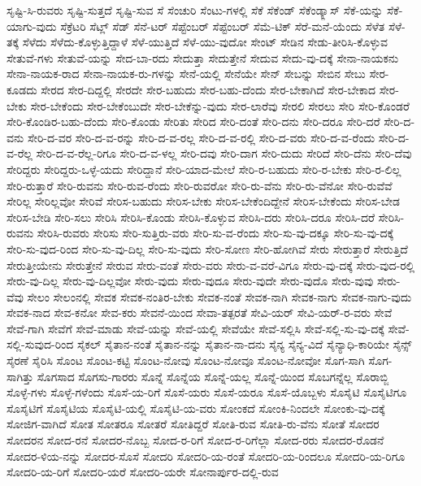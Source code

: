 {ಸೃಷ್ಟಿ-ಸಿ-ರುವರು
ಸೃಷ್ಟಿ-ಸುತ್ತದೆ
ಸೃಷ್ಟಿ-ಸುವ
ಸೆ
ಸೆಂಚುರಿ
ಸೆಂಟು-ಗಳಲ್ಲಿ
ಸೆಕೆ
ಸೆಕೆಂಡ್
ಸೆಕೆಂಡ್ಕ್ಲಾಸ್
ಸೆಕೆ-ಯನ್ನು
ಸೆಕೆ-ಯಾಗು-ವುದು
ಸೆಕ್ರೆಟರಿ
ಸೆಟ್ಲ್
ಸೆಡ್
ಸೆನೆ-ಟರ್
ಸೆಪ್ಟೆಂಬರ್
ಸೆಪ್ಟೆಂಬರ್
ಸೆಮೆ-ಟಿಕ್
ಸೆರೆ-ಮನೆ-ಯೆಂದು
ಸೆಳೆತ
ಸೆಳೆ-ತಕ್ಕೆ
ಸೆಳೆದು
ಸೆಳೆದು-ಕೊಳ್ಳುತ್ತಿದ್ದಾಳೆ
ಸೆಳೆ-ಯುತ್ತಿದೆ
ಸೆಳೆ-ಯು-ವುದೋ
ಸೇಂಟ್
ಸೇಡಿನ
ಸೇಡು-ತೀರಿಸಿ-ಕೊಳ್ಳುವ
ಸೇತುವೆ-ಗಳು
ಸೇತುವೆ-ಯನ್ನು
ಸೇದ-ಬಾ-ರದು
ಸೇದುತ್ತಾ
ಸೇದುತ್ತೇನೆ
ಸೇದುವ
ಸೇದು-ವು-ದಕ್ಕೆ
ಸೇನಾ-ನಾಯಕನು
ಸೇನಾ-ನಾಯಕ-ರಾದ
ಸೇನಾ-ನಾಯಕ-ರು-ಗಳನ್ನು
ಸೇನೆ-ಯಲ್ಲಿ
ಸೇನೆಯೇ
ಸೇನ್
ಸೇಬನ್ನು
ಸೇಬಿನ
ಸೇಬು
ಸೇರ-ಕೂಡದು
ಸೇರದ
ಸೇರ-ದಿದ್ದಲ್ಲಿ
ಸೇರದೇ
ಸೇರ-ಬಹುದು
ಸೇರ-ಬಹು-ದೆಂದು
ಸೇರ-ಬೇಕಾಗಿದೆ
ಸೇರ-ಬೇಕಾದ
ಸೇರ-ಬೇಕು
ಸೇರ-ಬೇಕೆಂದು
ಸೇರ-ಬೇಕೆಂಬುದೇ
ಸೇರ-ಬೇಕೆನ್ನು-ವುದು
ಸೇರ-ಲಾರೆವು
ಸೇರಲಿ
ಸೇರಲು
ಸೇರಿ
ಸೇರಿ-ಕೊಂಡರೆ
ಸೇರಿ-ಕೊಂಡಿರ-ಬಹು-ದೆಂದು
ಸೇರಿ-ಕೊಂಡು
ಸೇರಿತು
ಸೇರಿದ
ಸೇರಿ-ದಂತೆ
ಸೇರಿ-ದನು
ಸೇರಿ-ದರೂ
ಸೇರಿ-ದರೆ
ಸೇರಿ-ದ-ವನು
ಸೇರಿ-ದ-ವರ
ಸೇರಿ-ದ-ವ-ರನ್ನು
ಸೇರಿ-ದ-ವ-ರಲ್ಲ
ಸೇರಿ-ದ-ವ-ರಲ್ಲಿ
ಸೇರಿ-ದ-ವರು
ಸೇರಿ-ದ-ವ-ರೆಂದು
ಸೇರಿ-ದ-ವ-ರೆಲ್ಲ
ಸೇರಿ-ದ-ವ-ರೆಲ್ಲ-ರಿಗೂ
ಸೇರಿ-ದ-ವ-ಳಲ್ಲ
ಸೇರಿ-ದವು
ಸೇರಿ-ದಾಗ
ಸೇರಿ-ದುದು
ಸೇರಿದೆ
ಸೇರಿ-ದೆನು
ಸೇರಿ-ದೆವು
ಸೇರಿದ್ದರು
ಸೇರಿದ್ದರು-ಒಳ್ಳೆ-ಯದು
ಸೇರಿದ್ದಾನೆ
ಸೇರಿ-ಯಾದ-ಮೇಲೆ
ಸೇರಿ-ರ-ಬಹುದು
ಸೇರಿ-ರ-ಬೇಕು
ಸೇರಿ-ರ-ಲಿಲ್ಲ
ಸೇರಿ-ರುತ್ತಾರೆ
ಸೇರಿ-ರುವನು
ಸೇರಿ-ರುವ-ರೆಂದು
ಸೇರಿ-ರುವರೋ
ಸೇರಿ-ರು-ವೆನು
ಸೇರಿ-ರು-ವೆನೋ
ಸೇರಿ-ರುವೆವೆ
ಸೇರಿಲ್ಲ
ಸೇರಿಲ್ಲವೋ
ಸೇರಿವೆ
ಸೇರಿಸ-ಬಹುದು
ಸೇರಿಸ-ಬೇಕು
ಸೇರಿಸ-ಬೇಕೆಂದಿದ್ದೇನೆ
ಸೇರಿಸ-ಬೇಕೆಂದು
ಸೇರಿಸ-ಬೇಡ
ಸೇರಿಸ-ಬೇಡಿ
ಸೇರಿ-ಸಲು
ಸೇರಿಸಿ
ಸೇರಿಸಿ-ಕೊಂಡು
ಸೇರಿಸಿ-ಕೊಳ್ಳುವ
ಸೇರಿಸಿ-ದರು
ಸೇರಿಸಿ-ದರೂ
ಸೇರಿಸಿ-ದರೆ
ಸೇರಿಸಿ-ರುವನು
ಸೇರಿಸಿ-ರುವರು
ಸೇರಿಸು
ಸೇರಿ-ಸುತ್ತಿರು-ವರು
ಸೇರಿ-ಸು-ವ-ರೆಂದು
ಸೇರಿ-ಸು-ವು-ದಕ್ಕೂ
ಸೇರಿ-ಸು-ವು-ದಕ್ಕೆ
ಸೇರಿ-ಸು-ವುದ-ರಿಂದ
ಸೇರಿ-ಸು-ವು-ದಿಲ್ಲ
ಸೇರಿ-ಸು-ವುದು
ಸೇರಿ-ಸೋಣ
ಸೇರಿ-ಹೋಗಿವೆ
ಸೇರು
ಸೇರುತ್ತಾರೆ
ಸೇರುತ್ತಿದೆ
ಸೇರುತ್ತೀಯೇನು
ಸೇರುತ್ತೇನೆ
ಸೇರುವ
ಸೇರು-ವಂತೆ
ಸೇರು-ವರು
ಸೇರು-ವ-ವರೆ-ವಿಗೂ
ಸೇರು-ವು-ದಕ್ಕೆ
ಸೇರು-ವುದ-ರಲ್ಲಿ
ಸೇರು-ವು-ದಿಲ್ಲ
ಸೇರು-ವು-ದಿಲ್ಲವೋ
ಸೇರು-ವುದು
ಸೇರು-ವುದೂ
ಸೇರು-ವುದೇ
ಸೇರು-ವುದೊ
ಸೇರು-ವುವು
ಸೇರು-ವೆವು
ಸೇಲಂ
ಸೇಲಂನಲ್ಲಿ
ಸೇವಕ
ಸೇವಕ-ನಂತಿರ-ಬೇಕು
ಸೇವಕ-ನಂತೆ
ಸೇವಕ-ನಾಗಿ
ಸೇವಕ-ನಾಗು
ಸೇವಕ-ನಾಗು-ವುದು
ಸೇವಕ-ನಾದ
ಸೇವ-ಕನೋ
ಸೇವ-ಕರು
ಸೇವನೆ-ಯಿಂದ
ಸೇವಾ-ತತ್ಪರತೆ
ಸೇವಿ-ಯರ್
ಸೇವಿ-ಯರ್-ರ-ವರು
ಸೇವೆ
ಸೇವೆ-ಗಾಗಿ
ಸೇವೆಗೆ
ಸೇವೆ-ಮಾಡು
ಸೇವೆ-ಯನ್ನು
ಸೇವೆ-ಯಲ್ಲಿ
ಸೇವೆಯೇ
ಸೇವೆ-ಸಲ್ಲಿಸಿ
ಸೇವೆ-ಸಲ್ಲಿ-ಸು-ವು-ದಕ್ಕೆ
ಸೇವೆ-ಸಲ್ಲಿ-ಸುವುದ-ರಿಂದ
ಸೈಕಲ್
ಸೈತಾನ-ನಂತೆ
ಸೈತಾನ-ನನ್ನು
ಸೈತಾನ-ನಾ-ದನು
ಸೈನ್ಯ
ಸೈನ್ಯ-ವಿದೆ
ಸೈನ್ಯಾಧಿ-ಕಾರಿಯೇ
ಸೈನ್ಸ್
ಸೈರಣೆ
ಸೈರಿಸಿ
ಸೊಂಟ
ಸೊಂಟ-ಕಟ್ಟಿ
ಸೊಂಟ-ನೋವು
ಸೊಂಟ-ನೋವೂ
ಸೊಂಟ-ನೋವೋ
ಸೊಗ-ಸಾಗಿ
ಸೊಗ-ಸಾಗಿತ್ತು
ಸೊಗಸಾದ
ಸೊಗಸು-ಗಾರರು
ಸೊನ್ನೆ
ಸೊನ್ನೆಯ
ಸೊನ್ನೆ-ಯಲ್ಲ
ಸೊನ್ನೆ-ಯಿಂದ
ಸೊಬಗನ್ನೆಲ್ಲ
ಸೊರಾಬ್ಜಿ
ಸೊಳ್ಳೆ-ಗಳು
ಸೊಳ್ಳೆ-ಗಳೆಂದು
ಸೊಸೆ-ಯ-ರಿಗೆ
ಸೊಸೆ-ಯರು
ಸೊಸೆ-ಯರೂ
ಸೊಸೆ-ಯೊಬ್ಬಳು
ಸೊಸೈಟಿ
ಸೊಸೈಟಿಗೂ
ಸೊಸೈಟಿಗೆ
ಸೊಸೈಟಿಯ
ಸೊಸೈಟಿ-ಯಲ್ಲಿ
ಸೊಸೈಟಿ-ಯ-ವರು
ಸೋಂಕದೆ
ಸೋಂಕಿ-ನಿಂದಲೇ
ಸೋಂಕು-ವು-ದಕ್ಕೆ
ಸೋಜಿಗ-ವಾಗಿದೆ
ಸೋತ
ಸೋತರೂ
ಸೋತರೆ
ಸೋತಿದ್ದರೆ
ಸೋತಿ-ರುವ
ಸೋತಿ-ರು-ವೆನು
ಸೋತೆ
ಸೋದರ
ಸೋದರನ
ಸೋದ-ರನೆ
ಸೋದರ-ನೊಬ್ಬ
ಸೋದ-ರ-ರಿಗೆ
ಸೋದ-ರ-ರಿಗೆಲ್ಲಾ
ಸೋದ-ರರು
ಸೋದರ-ರೊಡನೆ
ಸೋದರ-ಳಿಯ-ನನ್ನು
ಸೋದರ-ಸೊಸೆ
ಸೋದರಿ
ಸೋದರಿ-ಯ-ರಂತೆ
ಸೋದರಿ-ಯ-ರಿಂದಲೂ
ಸೋದರಿ-ಯ-ರಿಗೂ
ಸೋದರಿ-ಯ-ರಿಗೆ
ಸೋದರಿ-ಯರೆ
ಸೋದರಿ-ಯರೇ
ಸೋನಾರ್ಪುರ-ದಲ್ಲಿ-ರುವ
}

